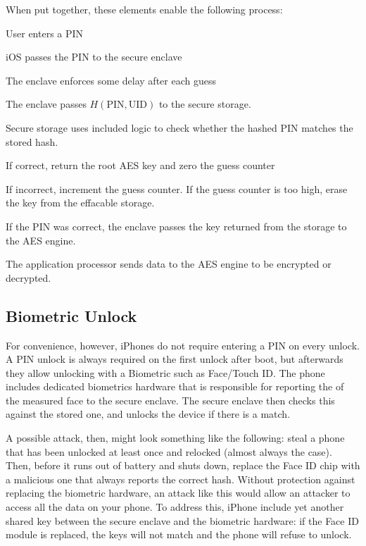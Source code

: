 When put together, these elements enable the following process:
\begin{compactenum}
	\item User enters a PIN
	\item iOS passes the PIN to the secure enclave 
	\item The enclave enforces some delay after each guess
	\item The enclave passes $H(\text{PIN}, \text{UID})$ to the secure storage. 
	\item Secure storage uses included logic to check whether the hashed PIN matches the stored hash.
		\begin{compactitem}
			\item If correct, return the root AES key and zero the guess counter
			\item If incorrect, increment the guess counter. If the guess counter is too high, erase the key from the effacable storage.
		\end{compactitem}
	\item If the PIN was correct, the enclave passes the key returned from the storage to the AES engine.
	\item The application processor sends data to the AES engine to be encrypted or decrypted.  
\end{compactenum}

\subsection{Biometric Unlock}
For convenience, however, iPhones do not require entering a PIN on every unlock. A PIN unlock is always required on the first unlock after boot, but afterwards they allow unlocking with a Biometric such as Face/Touch ID. The phone includes dedicated biometrics hardware that is responsible for reporting the  of the measured face to the secure enclave. The secure enclave then checks this against the stored one, and unlocks the device if there is a match.

A possible attack, then, might look something like the following: steal a phone that has been unlocked at least once and relocked (almost always the case). Then, before it runs out of battery and shuts down, replace the Face ID chip with a malicious one that always reports the correct hash. Without protection against replacing the biometric hardware, an attack like this would allow an attacker to access all the data on your phone. To address this, iPhone include yet another shared key between the secure enclave and the biometric hardware: if the Face ID module is replaced, the keys will not match and the phone will refuse to unlock.
